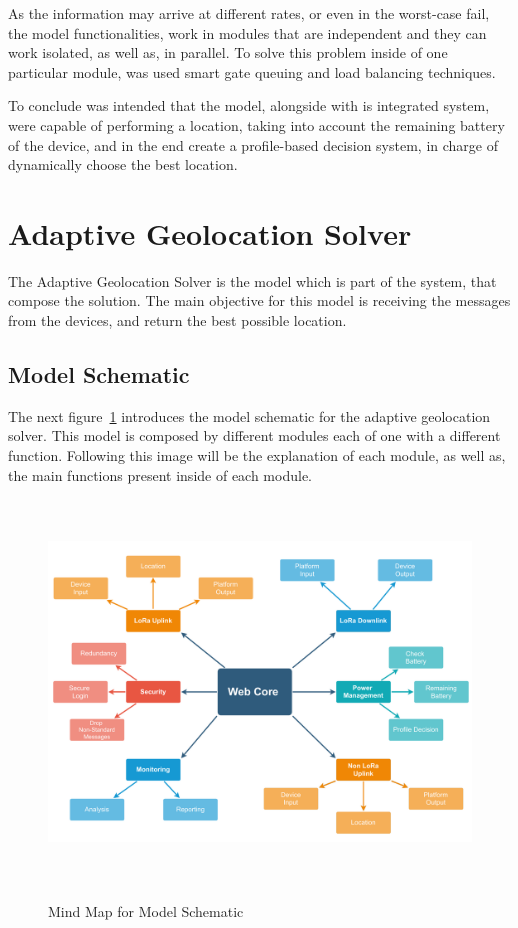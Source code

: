 As the information may arrive at different rates, or even in the worst-case fail, the model functionalities, work in modules that are independent and they can work isolated, as well as, in parallel. To solve this problem inside of one particular module, was used smart gate queuing and load balancing techniques.

To conclude was intended that the model, alongside with is integrated system, were capable of performing a location, taking into account the remaining battery of the device, and in the end create a profile-based decision system, in charge of dynamically choose the best location.





\newpage
\section{Adaptive Geolocation Solver}
The Adaptive Geolocation Solver is the model which is part of the system, that compose the solution. The main objective for this model is receiving the messages from the devices, and return the best possible location.


\label{sec:adaptive_geolocation_solver}
\subsection{Model Schematic}
The next figure~\ref{fig:Model_Schematic} introduces the model schematic for the adaptive geolocation solver.
This model is composed by different modules each of one with a different function. Following this image will be the explanation of each module, as well as, the main functions present inside of each module.

\begin{figure}[htbp]
  \centering
  
    {\includegraphics[height= 4in,width=0.92\linewidth]{Chapters/Figures/model_schematic3.pdf}}%
 
  \caption{Mind Map for Model Schematic}
  \label{fig:Model_Schematic}
\end{figure}


